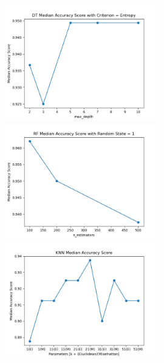 \documentclass{article}
\begin{document}
	\begin{figure}[htb]{\label{DT_Accuracies}}
		\includegraphics[width=0.6\textwidth]{DT_Accuracy_Score.png}
		\includegraphics[width=0.6\textwidth]{RF_Accuracy_Score.png}
		\includegraphics[width=0.6\textwidth]{KNN_Accuracy_Score.png}
	\end{figure}
	
\end{document}
